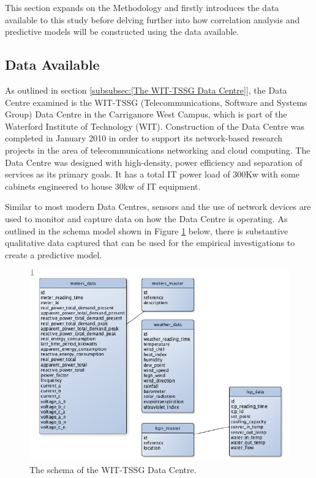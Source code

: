 \documentclass[12pt]{scrartcl}
\begin{document}
\label{sec:[Research Methods]}

This section expands on the Methodology and firstly introduces the data available to this study before delving further into how correlation analysis and predictive models will be constructed using the data available.

 

\subsection{Data Available}

\label{subsec:[Data Available]}

As outlined in section \ref{subsubsec:[The WIT-TSSG Data Centre]}, the Data Centre examined is the WIT-TSSG (Telecommunications, Software and Systems Group) Data Centre in the Carriganore West Campus, which is part of the Waterford Institute of Technology (WIT). Construction of the Data Centre was completed in January 2010 in order to support its network-based research projects in the area of telecommunications networking and cloud computing. The Data Centre was designed with high-density, power efficiency and separation of services as its primary goals. It has a total IT power load of 300Kw with some cabinets engineered to house 30kw of IT equipment.

 

Similar to most modern Data Centres, sensors and the use of network devices are used to monitor and capture data on how the Data Centre is operating. As outlined in the schema model shown in Figure \ref{fig:TSSGdataschema} below, there is substantive qualitative data captured that can be used for the empirical investigations to create a predictive model. 

 

\begin{figure}[H]

  \caption{The schema of the WIT-TSSG Data Centre.}

  \label{fig:TSSGdataschema}

  \centering

    \includegraphics[scale=0.45]{TSSG_Data_Schema}

\end{figure}
\end{document}
